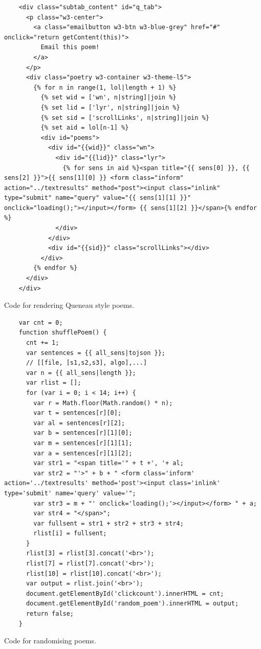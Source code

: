 \begin{listing}[h!]
  \begin{verbatim}
    <div class="subtab_content" id="q_tab">
      <p class="w3-center">
        <a class="emailbutton w3-btn w3-blue-grey" href="#" onclick="return getContent(this)">
          Email this poem!
        </a>
      </p>
      <div class="poetry w3-container w3-theme-l5">
        {% for n in range(1, lol|length + 1) %}
          {% set wid = ['wn', n|string]|join %}
          {% set lid = ['lyr', n|string]|join %}
          {% set sid = ['scrollLinks', n|string]|join %}
          {% set aid = lol[n-1] %}
          <div id="poems">
            <div id="{{wid}}" class="wn">
              <div id="{{lid}}" class="lyr">
                {% for sens in aid %}<span title="{{ sens[0] }}, {{ sens[2] }}">{{ sens[1][0] }} <form class="inform" action="../textresults" method="post"><input class="inlink" type="submit" name="query" value="{{ sens[1][1] }}" onclick="loading();"></input></form> {{ sens[1][2] }}</span>{% endfor %}
              </div>
            </div>
            <div id="{{sid}}" class="scrollLinks"></div>
          </div>
        {% endfor %}
      </div>
    </div>
  \end{verbatim}
\caption{Code for rendering Queneau style poems.}
\label{code:qpoems}
\end{listing}

\begin{listing}[h!]
  \begin{verbatim}
    var cnt = 0;
    function shufflePoem() {
      cnt += 1;
      var sentences = {{ all_sens|tojson }};
      // [[file, [s1,s2,s3], algo],...]
      var n = {{ all_sens|length }};
      var rlist = [];
      for (var i = 0; i < 14; i++) {
        var r = Math.floor(Math.random() * n);
        var t = sentences[r][0];
        var al = sentences[r][2];
        var b = sentences[r][1][0];
        var m = sentences[r][1][1];
        var a = sentences[r][1][2];
        var str1 = "<span title='" + t +', '+ al;
        var str2 = "'>" + b + " <form class='inform' action='../textresults' method='post'><input class='inlink' type='submit' name='query' value='";
        var str3 = m + "' onclick='loading();'></input></form> " + a;
        var str4 = "</span>";
        var fullsent = str1 + str2 + str3 + str4;
        rlist[i] = fullsent;
      }
      rlist[3] = rlist[3].concat('<br>');
      rlist[7] = rlist[7].concat('<br>');
      rlist[10] = rlist[10].concat('<br>');
      var output = rlist.join('<br>');
      document.getElementById('clickcount').innerHTML = cnt;
      document.getElementById('random_poem').innerHTML = output;
      return false;
    }
  \end{verbatim}
\caption{Code for randomising poems.}
\label{code:rpoemsjs}
\end{listing}



